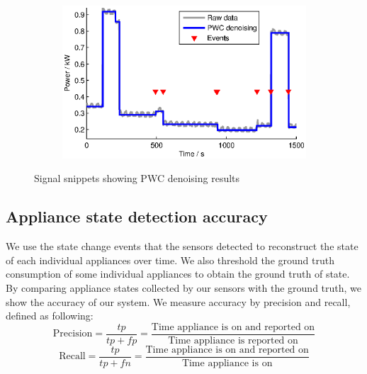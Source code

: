 \begin{figure}[htbp]
\begin{subfigure}[t]{0.47\textwidth}
        \caption{}
    \end{subfigure} 
    \begin{subfigure}[t]{0.47\textwidth}
        \centering
        \includegraphics[width=\textwidth] {../../sw/pc/matlab/pwc-result/4.eps}
        \caption{}
    \end{subfigure} 
    \caption{Signal snippets showing PWC denoising results}\label{fig:pwc-example}
\end{figure}

\subsection{Appliance state detection accuracy}

We use the state change events that the sensors detected to reconstruct the state of each individual appliances over time. We also threshold the ground truth consumption of some individual appliances to obtain the ground truth of state. By comparing appliance states collected by our sensors with the ground truth, we show the accuracy of our system. We measure accuracy by precision and recall, defined as following:
\[
\text{Precision} = \frac{tp}{tp+fp} = 
\frac{\text{Time appliance is on and reported on}}
{\text{Time appliance is reported on}}
\]
\[
\text{Recall} = \frac{tp}{tp+fn} = 
\frac{\text{Time appliance is on and reported on}}
{\text{Time appliance is on}}
\]

